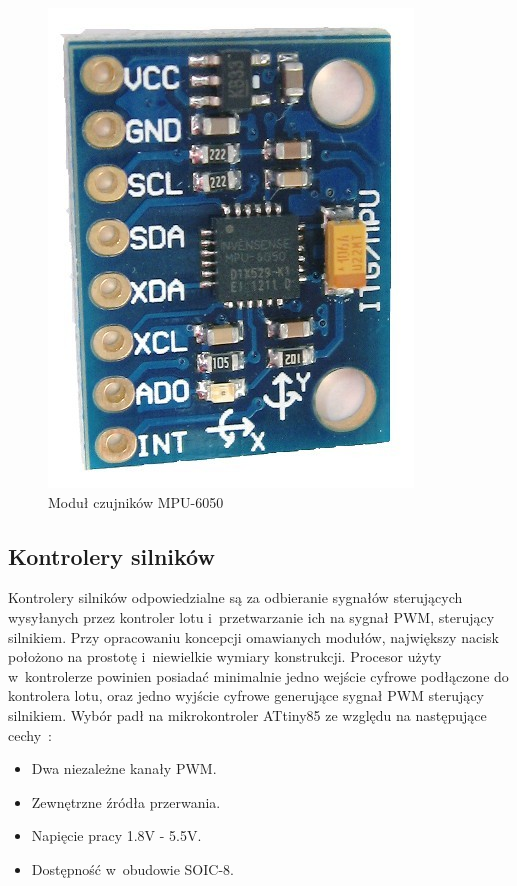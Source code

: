 \begin{figure}[H]
	\centering
	\includegraphics[scale=0.6]{Pictures/mpu-6050.jpg}
		\caption[Moduł czujników MPU-6050]{Moduł czujników MPU-6050}
	\label{fig:mpu-6050}
\end{figure}

\subsection{Kontrolery silników}
Kontrolery silników odpowiedzialne są za odbieranie sygnałów sterujących wysyłanych przez kontroler lotu i~przetwarzanie ich na sygnał PWM, sterujący silnikiem. Przy opracowaniu koncepcji omawianych modułów, największy nacisk położono na prostotę i~niewielkie wymiary konstrukcji. Procesor użyty w~kontrolerze powinien posiadać minimalnie jedno wejście cyfrowe podłączone do kontrolera lotu, oraz jedno wyjście cyfrowe generujące sygnał PWM sterujący silnikiem. Wybór padł na mikrokontroler ATtiny85 ze względu na następujące cechy~\cite{ds_attiny85}:

\begin{itemize}
	\item Dwa niezależne kanały PWM.
	\item Zewnętrzne źródła przerwania.
	\item Napięcie pracy 1.8V - 5.5V.
	\item Dostępność w~obudowie SOIC-8.
\end{itemize}

